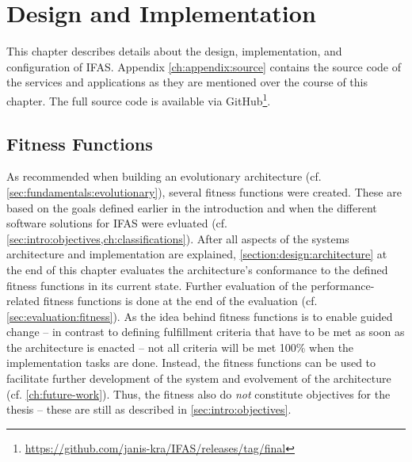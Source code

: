 %
\chapter{Design and Implementation}
\label{ch:implementation}

This chapter describes details about the design, implementation, and configuration of \acf{IFAS}.
Appendix \cref{ch:appendix:source} contains the source code of the services and applications as they are mentioned over the course of this chapter.
The full source code is available via GitHub\footnote{\url{https://github.com/janis-kra/IFAS/releases/tag/final}}.


\section{Fitness Functions}
\label{sec:implementation:fitness}

As recommended when building an evolutionary architecture (cf. \cref{sec:fundamentals:evolutionary}), several fitness functions were created.
These are based on the goals defined earlier in the introduction and when the different software solutions for \ac{IFAS} were evluated (cf. \cref{sec:intro:objectives,ch:classifications}).
After all aspects of the systems architecture and implementation are explained, \cref{section:design:architecture} at the end of this chapter evaluates the architecture's conformance to the defined fitness functions in its current state.
Further evaluation of the performance-related fitness functions is done at the end of the evaluation (cf. \cref{sec:evaluation:fitness}).
As the idea behind fitness functions is to enable guided change -- in contrast to defining fulfillment criteria that have to be met as soon as the architecture is enacted -- not all criteria will be met 100\% when the implementation tasks are done.
Instead, the fitness functions can be used to facilitate further development of the system and evolvement of the architecture (cf. \cref{ch:future-work}).
Thus, the fitness also do \emph{not} constitute objectives for the thesis -- these are still as described in \cref{sec:intro:objectives}.

